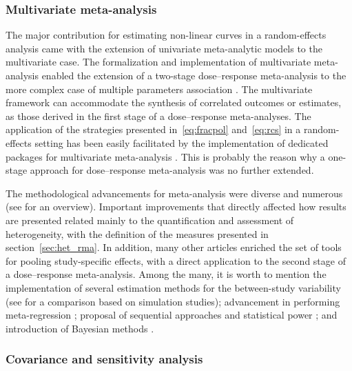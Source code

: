 \documentclass[11pt,a4paper,twoside,openany]{book}\usepackage{knitr}
\begin{document}
{\subsubsection*{Multivariate meta-analysis}

The major contribution for estimating non-linear curves in a random-effects analysis came with the extension of univariate meta-analytic models to the multivariate case. The formalization and implementation of multivariate meta-analysis enabled the extension of a two-stage dose--response meta-analysis to the more complex case of multiple parameters association \citep{gasparrini2012multivariate}. The multivariate framework can accommodate the synthesis of correlated outcomes or estimates, as those derived in the first stage of a dose--response meta-analyses. The application of the strategies presented in~\ref{eq:fracpol} and~\ref{eq:rcs} in a random-effects setting has been easily facilitated by the implementation of dedicated packages for multivariate meta-analysis \citep{white2011multivariate, jackson2011multivariate}. This is probably the reason why a one-stage approach for dose--response meta-analysis was no further extended.

\noindent The methodological advancements for meta-analysis were diverse and numerous (see \cite{sutton2008recent} for an overview). Important improvements that directly affected how results are presented related mainly to the quantification and assessment of heterogeneity, with the definition of the measures presented in section~\ref{sec:het_rma}. In addition, many other articles enriched the set of tools for pooling study-specific effects, with a direct application to the second stage of a dose--response meta-analysis. Among the many, it is worth to mention the implementation of several estimation methods for the between-study variability (see \cite{langan2017comparative} for a comparison based on simulation studies); advancement in performing meta-regression \citep{van2002advanced}; proposal of sequential approaches \citep{pogue1997cumulating} and statistical power \citep{sutton2007evidence}; and introduction of Bayesian methods \citep{sutton2001bayesian}.

\subsubsection*{Covariance and sensitivity analysis}

}
\end{document}
